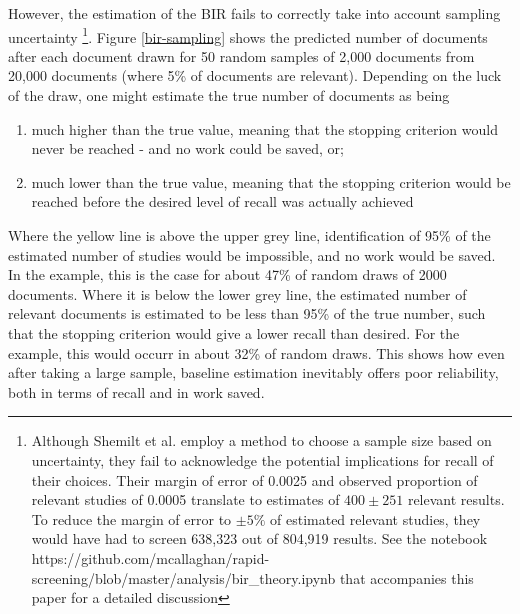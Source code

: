 \documentclass{bmcart}
\begin{document}
	
	However, the estimation of the BIR fails to correctly take into account sampling uncertainty \footnote{Although Shemilt et al. \cite{Shemilt2014} employ a method  to choose a sample size based on uncertainty, they fail to acknowledge the potential implications for recall of their choices. Their margin of error of 0.0025 and observed proportion of relevant studies of 0.0005 translate to estimates of $400 \pm 251$ relevant results. To reduce the margin of error to $\pm 5\%$ of estimated relevant studies, they would have had to screen 638,323 out of 804,919 results. See the notebook https://github.com/mcallaghan/rapid-screening/blob/master/analysis/bir_theory.ipynb that accompanies this paper for a detailed discussion}. 
	Figure \ref{bir-sampling} shows the predicted number of documents after each document drawn for 50 random samples of 2,000 documents from 20,000 documents (where 5\% of documents are relevant). 
	Depending on the luck of the draw, one might estimate the true number of documents as being
	\begin{enumerate}
		\item much higher than the true value, meaning that the stopping criterion would never be reached - and no work could be saved, or;
		\item much lower than the true value, meaning that the stopping criterion would be reached before the desired level of recall was actually achieved
	\end{enumerate}
	
	Where the yellow line is above the upper grey line, identification of 95\% of the estimated number of studies would be impossible, and no work would be saved. In the example, this is the case for about 47\% of random draws of 2000 documents. Where it is below the lower grey line, the estimated number of relevant documents is estimated to be less than 95\% of the true number, such that the stopping criterion would give a lower recall than desired. For the example, this would occurr in about 32\% of random draws.
	This shows how even after taking a large sample, baseline estimation inevitably offers poor reliability, both in terms of recall and in work saved.
\end{document}
